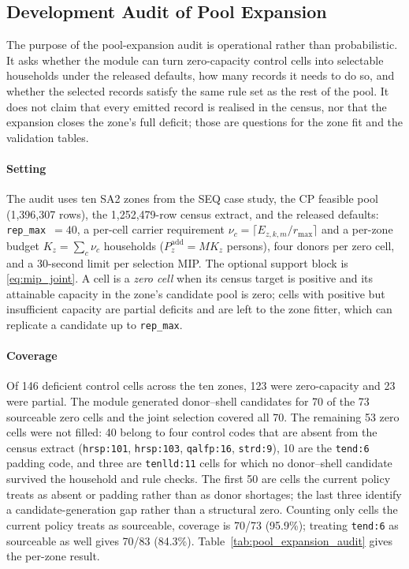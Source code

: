 ﻿\FloatBarrier
\subsection{Development Audit of Pool Expansion}
\label{sec:pool_expansion_audit}

The purpose of the pool-expansion audit is operational rather than
probabilistic. It asks whether the module can turn zero-capacity control cells
into selectable households under the released defaults, how many records it
needs to do so, and whether the selected records satisfy the same rule set as
the rest of the pool. It does not claim that every emitted record is realised
in the census, nor that the expansion closes the zone's full deficit; those are
questions for the zone fit and the validation tables.

\paragraph{Setting}
The audit uses ten SA2 zones from the SEQ case study, the CP feasible pool
(1{,}396{,}307 rows), the 1{,}252{,}479-row census extract, and the released
defaults: \texttt{rep\_max}~$=40$, a per-cell carrier requirement
$\nu_c=\lceil E_{z,k,m}/r_{\max}\rceil$ and a per-zone budget
$K_z=\sum_c\nu_c$ households ($P_z^{\mathrm{add}}=M K_z$ persons), four donors
per zero cell, and a 30-second limit per selection MIP.
The optional support block is \eqref{eq:mip_joint}. A cell is a \emph{zero cell} when
its census target is positive and its attainable capacity in the zone's
candidate pool is zero; cells with positive but insufficient capacity are
partial deficits and are left to the zone fitter, which can replicate a
candidate up to \texttt{rep\_max}.

\paragraph{Coverage}
Of 146 deficient control cells across the ten zones, 123 were zero-capacity and
23 were partial. The module generated donor--shell candidates for 70 of the 73
sourceable zero cells and the joint selection covered all 70. The remaining 53
zero cells were not filled: 40 belong to four control codes that are absent from
the census extract (\texttt{hrsp:101}, \texttt{hrsp:103}, \texttt{qalfp:16},
\texttt{strd:9}), 10 are the \texttt{tend:6} padding code, and three are
\texttt{tenlld:11} cells for which no donor--shell candidate survived the
household and rule checks. The first 50 are cells the current policy treats as absent or padding
rather than as donor shortages; the last three identify a candidate-generation
gap rather than a structural zero. Counting only cells the current policy treats as sourceable,
coverage is 70/73 (95.9\%); treating \texttt{tend:6} as sourceable as well gives
70/83 (84.3\%). Table~\ref{tab:pool_expansion_audit} gives the per-zone result.

